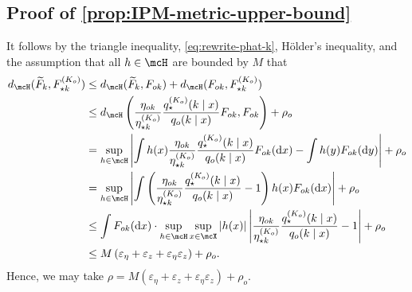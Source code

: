 \subsection{Proof of \cref{prop:IPM-metric-upper-bound}}
It follows by the triangle inequality, \cref{eq:rewrite-phat-k}, H\"older's inequality, and the assumption that all $h \in \mcH$ are bounded by $M$ that
\begin{align}
	d_{\mcH}(\widetilde{F}_{k},F^{(\numcomps_{o})}_{\opt k})                                                                                                                                                                                         
	 & \le d_{\mcH}(\widetilde{F}_{k},F_{ok}) + d_{\mcH}(F_{ok},F^{(\numcomps_{o})}_{\opt k})                                                                                                                                                                  \\
	 & \le d_{\mcH}\left(\frac{\eta_{ok}}{\eta^{(\numcomps_{o})}_{\star k}} \frac{q_{\star}^{(\numcomps_{o})}(k \mid x)}{q_{o}(k \mid x)} F_{ok},F_{ok}\right) + \rho_{o}                                                                                    \\
	 & = \sup_{h\in \mcH} \left\vert \int h(x) \frac{\eta_{ok}}{\eta^{(\numcomps_{o})}_{\star k}} \frac{q_{\star}^{(\numcomps_{o})}(k \mid x)}{q_{o}(k \mid x)} F_{ok}(\dee x) - \int h(y) F_{ok}(\dee y)   \right\vert
	+ \rho_{o}                                                                                                                                                                                                                                             \\
	 & =  \sup_{h\in \mcH} \left\vert \int \left(\frac{\eta_{ok}}{\eta^{(\numcomps_{o})}_{\star k}} \frac{q_{\star}^{(\numcomps_{o})}(k \mid x)}{q_{o}(k \mid x)}-1\right) h(x) F_{ok}(\dee x)   \right\vert
	+ \rho_{o}                                                                                                                                                                                                                                             \\
	 & \le \int F_{ok}(\dee x)\cdot  \sup_{h\in \mcH} \sup_{x \in \mcX} \left\vert  h(x)   \right\vert \left\vert \frac{\eta_{ok}}{\eta^{(\numcomps_{o})}_{\star k}} \frac{q_{\star}^{(\numcomps_{o})}(k \mid x)}{q_{o}(k \mid x)}-1 \right\vert  + \rho_{o} \\
	 & \le M \left(\varepsilon_{\eta}+\varepsilon_{z}+\varepsilon_{\eta}\varepsilon_{z}\right)
	+ \rho_{o}.
\end{align}
Hence, we may take $\rho = M\left(\varepsilon_{\eta}+\varepsilon_{z}+\varepsilon_{\eta}\varepsilon_{z}\right)  +\rho_{o}$.

